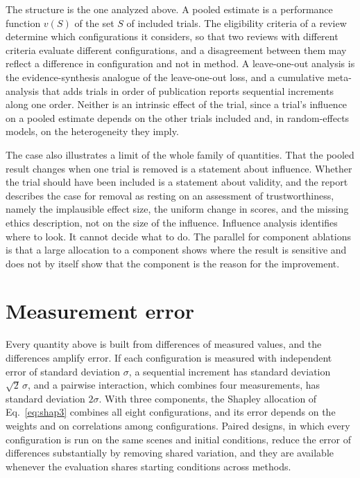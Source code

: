 \documentclass[11pt]{article}
\theoremstyle{plain}
\theoremstyle{remark}
\begin{document}
The structure is the one analyzed above. A pooled estimate is a performance function $v(S)$ of the set $S$ of included trials. The eligibility criteria of a review determine which configurations it considers, so that two reviews with different criteria evaluate different configurations, and a disagreement between them may reflect a difference in configuration and not in method. A leave-one-out analysis is the evidence-synthesis analogue of the leave-one-out loss, and a cumulative meta-analysis that adds trials in order of publication reports sequential increments along one order. Neither is an intrinsic effect of the trial, since a trial's influence on a pooled estimate depends on the other trials included and, in random-effects models, on the heterogeneity they imply.

The case also illustrates a limit of the whole family of quantities. That the pooled result changes when one trial is removed is a statement about influence. Whether the trial should have been included is a statement about validity, and the report describes the case for removal as resting on an assessment of trustworthiness, namely the implausible effect size, the uniform change in scores, and the missing ethics description, not on the size of the influence. Influence analysis identifies where to look. It cannot decide what to do. The parallel for component ablations is that a large allocation to a component shows where the result is sensitive and does not by itself show that the component is the reason for the improvement.

\section{Measurement error}\label{sec:noise}

Every quantity above is built from differences of measured values, and the differences amplify error. If each configuration is measured with independent error of standard deviation $\sigma$, a sequential increment has standard deviation $\sqrt2\,\sigma$, and a pairwise interaction, which combines four measurements, has standard deviation $2\sigma$. With three components, the Shapley allocation of Eq.~\eqref{eq:shap3} combines all eight configurations, and its error depends on the weights and on correlations among configurations. Paired designs, in which every configuration is run on the same scenes and initial conditions, reduce the error of differences substantially by removing shared variation, and they are available whenever the evaluation shares starting conditions across methods.
\end{document}
